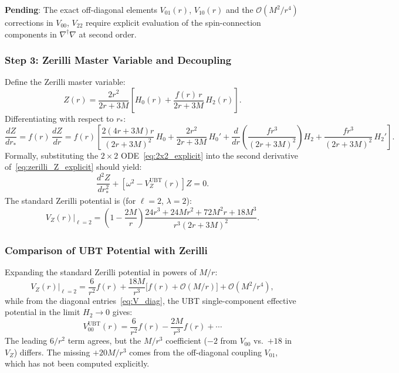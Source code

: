 \documentclass[12pt]{article}
\theoremstyle{definition}
\theoremstyle{remark}
\begin{document}
\textbf{Pending}: The exact off-diagonal elements $V_{01}(r)$, $V_{10}(r)$ and the
$\mathcal{O}(M^2/r^4)$ corrections in $V_{00}$, $V_{22}$ require explicit
evaluation of the spin-connection components in $\nabla^\dagger\nabla$ at
second order.

\subsubsection{Step 3: Zerilli Master Variable and Decoupling}

Define the Zerilli master variable:
\begin{equation}
  Z(r) = \frac{2r^2}{2r+3M}
    \left[H_0(r) + \frac{f(r)\,r}{2r+3M}\,H_2(r)\right].
  \label{eq:zerilli_Z_explicit}
\end{equation}
Differentiating with respect to $r_*$:
\begin{equation}
  \frac{dZ}{dr_*} = f(r)\,\frac{dZ}{dr}
    = f(r)\left[\frac{2(4r+3M)r}{(2r+3M)^2}\,H_0
      + \frac{2r^2}{2r+3M}\,H_0'
      + \frac{d}{dr}\!\left(\frac{f r^3}{(2r+3M)^2}\right) H_2
      + \frac{f r^3}{(2r+3M)^2}\,H_2'
      \right].
  \label{eq:dZdr}
\end{equation}
Formally, substituting the $2\times 2$ ODE~\eqref{eq:2x2_explicit} into the
second derivative of~\eqref{eq:zerilli_Z_explicit} should yield:
\begin{equation}
  \frac{d^2 Z}{dr_*^2} + \left[\omega^2 - V_Z^{\text{UBT}}(r)\right] Z = 0.
  \label{eq:zerilli_master_formal}
\end{equation}
The standard Zerilli potential is (for $\ell = 2$, $\lambda = 2$):
\begin{equation}
  V_Z(r)\big|_{\ell=2}
    = \left(1-\frac{2M}{r}\right)
      \frac{24r^3 + 24Mr^2 + 72M^2 r + 18M^3}{r^3(2r+3M)^2}.
  \label{eq:VZ_l2_redux}
\end{equation}

\subsubsection{Comparison of UBT Potential with Zerilli}

Expanding the standard Zerilli potential in powers of $M/r$:
\begin{equation}
  V_Z(r)\big|_{\ell=2}
    = \frac{6}{r^2}f(r) + \frac{18M}{r^3}\bigl[f(r) + \mathcal{O}(M/r)\bigr]
      + \mathcal{O}(M^2/r^4),
  \label{eq:VZ_expansion_redux}
\end{equation}
while from the diagonal entries~\eqref{eq:V_diag}, the UBT single-component
effective potential in the limit $H_2 \to 0$ gives:
\begin{equation}
  V_{00}^{\text{UBT}}(r) = \frac{6}{r^2}f(r) - \frac{2M}{r^3}f(r) + \cdots
  \label{eq:V00_UBT}
\end{equation}
The leading $6/r^2$ term agrees, but the $M/r^3$ coefficient ($-2$ from
$V_{00}$ vs.\ $+18$ in $V_Z$) differs.  The missing $+20M/r^3$ comes from
the off-diagonal coupling $V_{01}$, which has not been computed explicitly.
\end{document}
